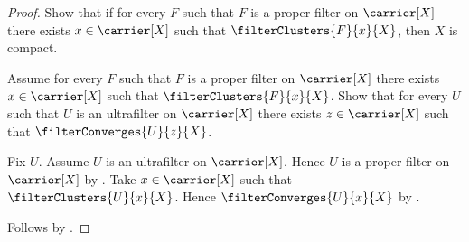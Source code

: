 \begin{proof}
    Show that if for every $F$ such that
        $F$ is a proper filter on $\carrier[X]$ there exists
        $x\in\carrier[X]$ such that $\filterClusters{F}{x}{X}$, then
        $X$ is compact.
    \begin{subproof}
        Assume for every $F$ such that
            $F$ is a proper filter on $\carrier[X]$ there exists
            $x\in\carrier[X]$ such that $\filterClusters{F}{x}{X}$.
        Show that for every $U$ such that
            $U$ is an ultrafilter on $\carrier[X]$ there exists
            $z\in\carrier[X]$ such that $\filterConverges{U}{z}{X}$.
        \begin{subproof}
            Fix $U$.
            Assume $U$ is an ultrafilter on $\carrier[X]$.
            Hence $U$ is a proper filter on $\carrier[X]$ by
                .
            Take $x\in\carrier[X]$ such that
                $\filterClusters{U}{x}{X}$.
            Hence $\filterConverges{U}{x}{X}$ by
                .
        \end{subproof}
    \end{subproof}
    Follows by \auto.
\end{proof}
